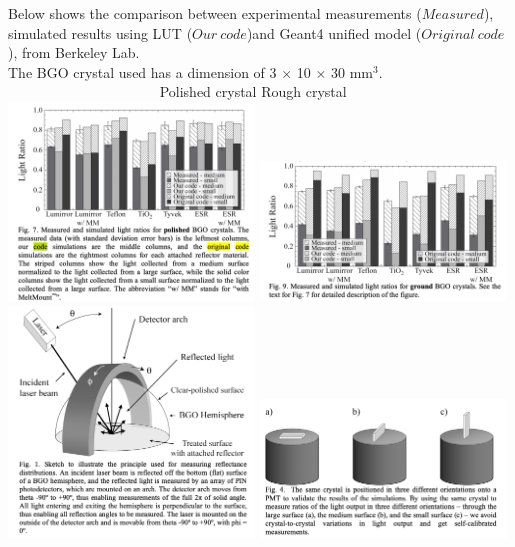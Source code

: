 \documentclass[xcolor=x11names, compress, handout]{beamer}
\renewcommand{\(}{\begin{columns}}
\renewcommand{\)}{\end{columns}}
\newcommand{\<}[1]{\begin{column}{#1}}
\renewcommand{\>}{\end{column}}
\begin{document}
\begin{frame}
\scriptsize
Below shows the comparison between experimental measurements ($Measured$), simulated results using LUT ($Our ~code$)and Geant4 unified model ($Original~code$), from Berkeley Lab. \cite{janecek_2012} \\
The BGO crystal used has a dimension of 3 $\times$ 10 $\times$ 30 mm$^3$.
\scriptsize  \flushleft~~~~~~~~~~~~~~~~~~~~~ Polished crystal \hspace{4cm} Rough crystal
\includegraphics[width=0.49\textwidth, height=0.4\textheight]{images/bgo_polished.png}
\includegraphics[width=0.49\textwidth, height=0.4\textheight]{images/bgo_rough.png}
\includegraphics[width=0.49\textwidth, height=0.4\textheight]{images/bgo_setup.png}
\includegraphics[width=0.49\textwidth, height=0.4\textheight]{images/bgo_orientation.png}
\end{frame}
\end{document}

